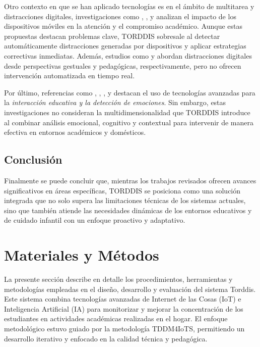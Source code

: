 \documentclass[a4paper,fleqn]{cas-sc}
\begin{document}
					Otro contexto en que se han aplicado tecnologías es en el ámbito de multitarea y distracciones digitales, investigaciones como \cite{Hartley2022Smartphone}, \cite{Labar2019Interplay}, y \cite{Farsani2020} analizan el impacto de los dispositivos móviles en la atención y el compromiso académico. Aunque estas propuestas destacan problemas clave, TORDDIS sobresale al detectar automáticamente distracciones generadas por dispositivos y aplicar estrategias correctivas inmediatas. Además, estudios como \cite{Erazo2016Easing} y \cite{Wang2022Empowering} abordan distracciones digitales desde perspectivas gestuales y pedagógicas, respectivamente, pero no ofrecen intervención automatizada en tiempo real.
				
					Por último, referencias como \cite{Kulkarni2023 }, \cite{Enadula2021}, \cite{Ozdamli2022}, y \cite{Warren2015Brief} destacan el uso de tecnologías avanzadas para la \textit{interacción educativa y la detección de emociones}. Sin embargo, estas investigaciones no consideran la multidimensionalidad que TORDDIS introduce al combinar análisis emocional, cognitivo y contextual para intervenir de manera efectiva en entornos académicos y domésticos.
			
			\subsection{Conclusión}
				Finalmente se puede concluir que, mientras los trabajos revisados ofrecen avances significativos en áreas específicas, TORDDIS se posiciona como una solución integrada que no solo supera las limitaciones técnicas de los sistemas actuales, sino que también atiende las necesidades dinámicas de los entornos educativos y de cuidado infantil con un enfoque proactivo y adaptativo.
						
	\section{Materiales y Métodos}
	\label{seccion:Cuatro}
		La presente sección describe en detalle los procedimientos, herramientas y metodologías empleadas en el diseño, desarrollo y evaluación del sistema Torddis. Este sistema combina tecnologías avanzadas de Internet de las Cosas (IoT) e Inteligencia Artificial (IA) para monitorizar y mejorar la concentración de los estudiantes en actividades académicas realizadas en el hogar. El enfoque metodológico estuvo guiado por la metodología TDDM4IoTS, permitiendo un desarrollo iterativo y enfocado en la calidad técnica y pedagógica.
		
\end{document}
